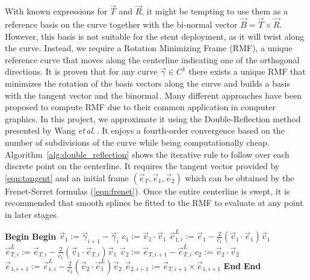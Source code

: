 With known expressions for $\vec{T}$ and $\vec{R}$, it might be tempting to use them as a reference basis on the curve together with the bi-normal vector $\vec{B} = \vec{T}\times\vec{R}$. However, this basis is not suitable for the stent deployment, as it will twist along the curve. Instead, we require a Rotation Minimizing Frame (RMF), a unique reference curve that moves along the centerline indicating one of the orthogonal directions. It is proven that for any curve $\vec{\gamma}\in C^1$ there exists a unique RMF that minimizes the rotation of the basis vectors along the curve and builds a basis with the tangent vector and the binormal\,\cite{Wang2008}. Many different approaches have been proposed to compute RMF due to their common application in computer graphics. In this project, we approximate it using the Double-Reflection method presented by Wang \textit{et\,al.}\,\cite{Wang2008}. It enjoys a fourth-order convergence based on the number of subdivisions of the curve while being computationally cheap. Algorithm~\ref{alg:double_reflection} shows the iterative rule to follow over each discrete point on the centerline. It requires the tangent vector provided by \autoref{eqn:tangent} and an initial frame $(\vec{e}_T, \vec{e}_1,\vec{e}_2)$ which can be obtained by the Frenet-Serret formulas (\autoref{eqn:frenet}). Once the entire centerline is swept, it is recommended that smooth splines be fitted to the RMF to evaluate at any point in later stages.
\begin{algorithm}
	\caption{Double-Reflection Method for RMF computation\,\cite{Wang2008}}\label{alg:double_reflection}
	\begin{algorithmic}[1]
		\State\textbf{Begin}
		\State\textbf{Begin}
		\State$\vec{v}_1 :=\vec{\gamma}_{i+1} - \vec{\gamma}_i$
		\State$c_1 :=\vec{v}_1 \cdot \vec{v}_1$
		\State$\vec{e}_{1, i}^L:= \vec{e}_1 - \frac{2}{c_1} (\vec{v}_1 \cdot \vec{e}_1)\vec{v}_1$
		\State$\vec{e}_{T,i}^L:=\vec{e}_{T,i} - \frac{2}{c_1} (\vec{v}_1 \cdot \vec{e}_{T,i})\vec{v}_1$
		\State$\vec{v}_2:= \vec{e}_{T,i+1} - \vec{e}_{T,i}^L$
		\State$c_2 := \vec{v}_2 \cdot \vec{v}_2$
		\State$\vec{e}_{1,i+1}:=\vec{e}_{1, i}^L - \frac{2}{c_2} (\vec{v}_2 \cdot \vec{e}_1^L)\vec{v}_2$
		\State$\vec{e}_{2,i+1}:=\vec{e}_{T,i+1}\times\vec{e}_{1, i+1}$
		\State\textbf{End}
		\EndFor{}
		\State\textbf{End}
	\end{algorithmic}
\end{algorithm}
